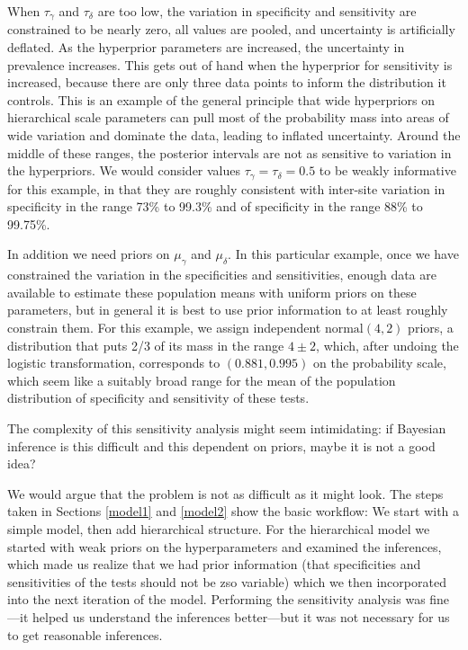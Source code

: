 \documentclass[11pt]{article}
\begin{document}
When $\tau_{\gamma}$ and $\tau_{\delta}$ are too low, the variation in
specificity and sensitivity are constrained to be nearly zero, all
values are pooled, and uncertainty is artificially deflated. As the
hyperprior parameters are increased, the uncertainty in prevalence
increases. This gets out of hand when the hyperprior for sensitivity
is increased, because there are only three data points to inform the
distribution it controls. This is an example of the general principle
that wide hyperpriors on hierarchical scale parameters can pull most
of the probability mass into areas of wide variation and dominate the
data, leading to inflated uncertainty.  Around the middle of these
ranges, the posterior intervals are not as sensitive to variation in
the hyperpriors. We would consider values
$\tau_{\gamma}=\tau_{\delta}=0.5$ to be weakly informative for this
example, in that they are roughly consistent with inter-site variation
in specificity in the range 73\% to 99.3\% and of specificity in the
range 88\% to 99.75\%.

In addition we need priors on $\mu_{\gamma}$ and $\mu_{\delta}$.  In
this particular example, once we have constrained the variation in the
specificities and sensitivities, enough data are available to estimate
these population means with uniform priors on these parameters, but in
general it is best to use prior information to at least roughly
constrain them.  For this example, we assign independent
$\mbox{normal}(4,2)$ priors, a distribution that puts 2/3 of its mass
in the range $4\pm 2$, which, after undoing the logistic
transformation, corresponds to $(0.881, 0.995)$ on the probability
scale, which seem like a suitably broad range for the mean of the
population distribution of specificity and sensitivity of these tests.

The complexity of this sensitivity analysis might seem intimidating:
if Bayesian inference is this difficult and this dependent on priors,
maybe it is not a good idea?

We would argue that the problem is not as difficult as it might look.
The steps taken in Sections \ref{model1} and \ref{model2} show the
basic workflow: We start with a simple model, then add hierarchical
structure.  For the hierarchical model we started with weak priors on
the hyperparameters and examined the inferences, which made us realize
that we had prior information (that specificities and sensitivities of
the tests should not be zso variable) which we then incorporated into
the next iteration of the model.  Performing the sensitivity analysis
was fine---it helped us understand the inferences better---but it was
not necessary for us to get reasonable inferences.
\end{document}
